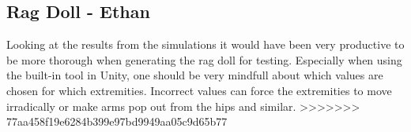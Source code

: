 \subsection{Rag Doll - Ethan} Looking at the results from the simulations it
would have been very productive to be more thorough when generating the rag
doll for testing. Especially when using the built-in tool in Unity, one should
be very mindfull about which values are chosen for which extremities. Incorrect
values can force the extremities to move irradically or make arms pop out from
the hips and similar.
>>>>>>> 77aa458f19e6284b399e97bd9949aa05c9d65b77
